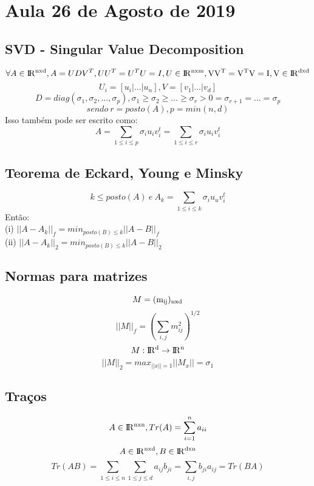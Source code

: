 \section{Aula 26 de Agosto de 2019}
\label{2019_08_26}

\subsection{SVD - Singular Value Decomposition}

\[ \forall A \in {\rm I\!R^{nxd}} , A = UDV^T, UU^T = U^TU = I, U \in \rm I\!R^{nxm},VV^T = V^TV = I, V \in \rm I\!R^{dxd} \]
\[U_i = [ u_i | ... | u_n ], V = [v_1 | ... | v_d]\]
\[D = diag(\sigma_1,\sigma_2,...,\sigma_p), \sigma_1 \geq \sigma_2 \geq ... \geq \sigma_r > 0 = \sigma_{r+1} = ... = \sigma_p \]
\[sendo\ r = posto(A), p = min(n,d)\]
Isso também pode ser escrito como: 
\[A = \sum_{1 \leq i \leq p} \sigma_i u_i v_i^t =  \sum_{1 \leq i \leq r} \sigma_i u_i v_i^t \]

\subsection{Teorema de Eckard, Young e Minsky}

\[k\leq posto(A) \ e \ A_k = \sum_{1\leq i \leq k} \sigma_i u_u v_i^t\]
Então:\\

(i) $ ||A-A_k||_f = min_{posto(B) \leq k} ||A-B||_f $\\

(ii) $ ||A-A_k||_2 = min_{posto(B) \leq k} ||A-B||_2 $

\subsection{Normas para matrizes}

\[M = \rm{(m_{ij})_{nxd}}\]
\[||M||_f = ( \sum_{i,j} m_{ij}^2)^{1/2} \]
\[M:  {\rm I\!R^{d}} \rightarrow  {\rm I\!R^{n}} \]
\[||M||_2 = max_{||x||=1} ||M_x|| = \sigma_1\]

\subsection{Traços}

\[A\in {\rm I\!R^{nxn}}, Tr(A) = \sum_{i=1}^n a_{ii}\]
\[A \in   {\rm I\!R^{nxd}}, B \in   {\rm I\!R^{dxn}} \]
\[Tr(AB) =  \sum_{1 \leq i \leq n} \sum_{1\leq j \leq d} a_{ij}b_{ji} = \sum_{i,j} b_{ji} a_{ij} = Tr(BA)\]\\


